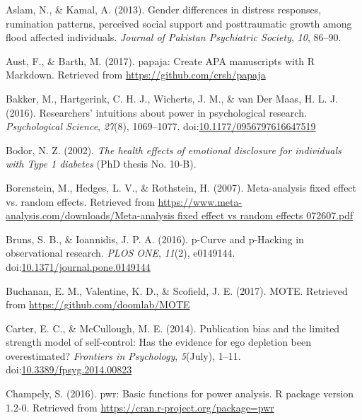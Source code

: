 \documentclass[,man]{apa6}
\begin{document}
\leavevmode\hypertarget{ref-Aslam2013}{}%
Aslam, N., \& Kamal, A. (2013). Gender differences in distress responses, rumination patterns, perceived social support and posttraumatic growth among flood affected individuals. \emph{Journal of Pakistan Psychiatric Society}, \emph{10}, 86--90.

\leavevmode\hypertarget{ref-Aust2017}{}%
Aust, F., \& Barth, M. (2017). papaja: Create APA manuscripts with R Markdown. Retrieved from \url{https://github.com/crsh/papaja}

\leavevmode\hypertarget{ref-Bakker2016}{}%
Bakker, M., Hartgerink, C. H. J., Wicherts, J. M., \& van Der Maas, H. L. J. (2016). Researchers' intuitions about power in psychological research. \emph{Psychological Science}, \emph{27}(8), 1069--1077. doi:\href{https://doi.org/10.1177/0956797616647519}{10.1177/0956797616647519}

\leavevmode\hypertarget{ref-Bodor2002}{}%
Bodor, N. Z. (2002). \emph{The health effects of emotional disclosure for individuals with Type 1 diabetes} (PhD thesis No. 10-B).

\leavevmode\hypertarget{ref-Borenstein2007}{}%
Borenstein, M., Hedges, L. V., \& Rothstein, H. (2007). Meta-analysis fixed effect vs. random effects. Retrieved from \href{https://www.meta-analysis.com/downloads/Meta-analysis\%20fixed\%20effect\%20vs\%20random\%20effects\%20072607.pdf}{https://www.meta-analysis.com/downloads/Meta-analysis fixed effect vs random effects 072607.pdf}

\leavevmode\hypertarget{ref-Bruns2016}{}%
Bruns, S. B., \& Ioannidis, J. P. A. (2016). p-Curve and p-Hacking in observational research. \emph{PLOS ONE}, \emph{11}(2), e0149144. doi:\href{https://doi.org/10.1371/journal.pone.0149144}{10.1371/journal.pone.0149144}

\leavevmode\hypertarget{ref-Buchanan2017}{}%
Buchanan, E. M., Valentine, K. D., \& Scofield, J. E. (2017). MOTE. Retrieved from \url{https://github.com/doomlab/MOTE}

\leavevmode\hypertarget{ref-Carter2014}{}%
Carter, E. C., \& McCullough, M. E. (2014). Publication bias and the limited strength model of self-control: Has the evidence for ego depletion been overestimated? \emph{Frontiers in Psychology}, \emph{5}(July), 1--11. doi:\href{https://doi.org/10.3389/fpsyg.2014.00823}{10.3389/fpsyg.2014.00823}

\leavevmode\hypertarget{ref-Champely2016}{}%
Champely, S. (2016). pwr: Basic functions for power analysis. R package version 1.2-0. Retrieved from \url{https://cran.r-project.org/package=pwr}
\end{document}
